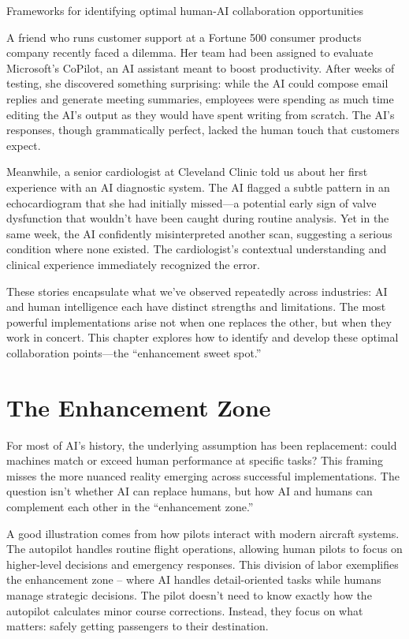 \documentclass[
  Letterpaper,
]{scrbook}
\begin{document}
Frameworks for identifying optimal human-AI collaboration opportunities

\hfill\break

A friend who runs customer support at a Fortune 500 consumer products
company recently faced a dilemma. Her team had been assigned to evaluate
Microsoft's CoPilot, an AI assistant meant to boost productivity. After
weeks of testing, she discovered something surprising: while the AI
could compose email replies and generate meeting summaries, employees
were spending as much time editing the AI's output as they would have
spent writing from scratch. The AI's responses, though grammatically
perfect, lacked the human touch that customers expect.

Meanwhile, a senior cardiologist at Cleveland Clinic told us about her
first experience with an AI diagnostic system. The AI flagged a subtle
pattern in an echocardiogram that she had initially missed---a potential
early sign of valve dysfunction that wouldn't have been caught during
routine analysis. Yet in the same week, the AI confidently
misinterpreted another scan, suggesting a serious condition where none
existed. The cardiologist's contextual understanding and clinical
experience immediately recognized the error.

These stories encapsulate what we've observed repeatedly across
industries: AI and human intelligence each have distinct strengths and
limitations. The most powerful implementations arise not when one
replaces the other, but when they work in concert. This chapter explores
how to identify and develop these optimal collaboration points---the
``enhancement sweet spot.''

\section{The Enhancement Zone}\label{the-enhancement-zone}

For most of AI's history, the underlying assumption has been
replacement: could machines match or exceed human performance at
specific tasks? This framing misses the more nuanced reality emerging
across successful implementations. The question isn't whether AI can
replace humans, but how AI and humans can complement each other in the
``enhancement zone.''

A good illustration comes from how pilots interact with modern aircraft
systems. The autopilot handles routine flight operations, allowing human
pilots to focus on higher-level decisions and emergency responses. This
division of labor exemplifies the enhancement zone -- where AI handles
detail-oriented tasks while humans manage strategic decisions. The pilot
doesn't need to know exactly how the autopilot calculates minor course
corrections. Instead, they focus on what matters: safely getting
passengers to their destination.
\end{document}
